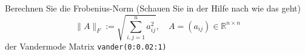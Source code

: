 \begin{aufg}[0]
Berechnen Sie die Frobenius-Norm (Schauen Sie in der Hilfe nach wie das geht)
\[ \|A \|_F := \sqrt{ \sum_{i,j=1}^n a_{ij}^2 }, \quad A=(a_{ij}) \in
\mathbb{R}^{n \times n}  \]
der Vandermode Matrix 
\lstinline!vander(0:0.02:1)! 
\end{aufg}